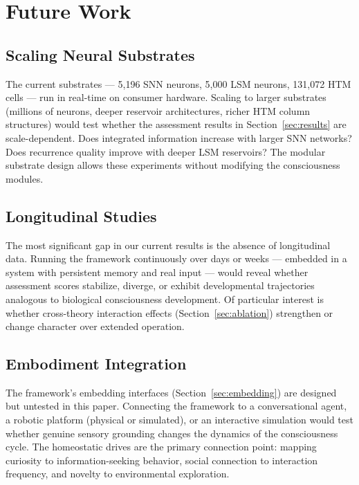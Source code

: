 \section{Future Work}
\label{sec:future_work}

\subsection{Scaling Neural Substrates}

The current substrates --- 5,196 SNN neurons, 5,000 LSM neurons, 131,072 HTM cells --- run in real-time on consumer hardware. Scaling to larger substrates (millions of neurons, deeper reservoir architectures, richer HTM column structures) would test whether the assessment results in Section~\ref{sec:results} are scale-dependent. Does integrated information increase with larger SNN networks? Does recurrence quality improve with deeper LSM reservoirs? The modular substrate design allows these experiments without modifying the consciousness modules.

\subsection{Longitudinal Studies}

The most significant gap in our current results is the absence of longitudinal data. Running the framework continuously over days or weeks --- embedded in a system with persistent memory and real input --- would reveal whether assessment scores stabilize, diverge, or exhibit developmental trajectories analogous to biological consciousness development. Of particular interest is whether cross-theory interaction effects (Section~\ref{sec:ablation}) strengthen or change character over extended operation.

\subsection{Embodiment Integration}

The framework's embedding interfaces (Section~\ref{sec:embedding}) are designed but untested in this paper. Connecting the framework to a conversational agent, a robotic platform (physical or simulated), or an interactive simulation would test whether genuine sensory grounding changes the dynamics of the consciousness cycle. The homeostatic drives are the primary connection point: mapping curiosity to information-seeking behavior, social connection to interaction frequency, and novelty to environmental exploration.

